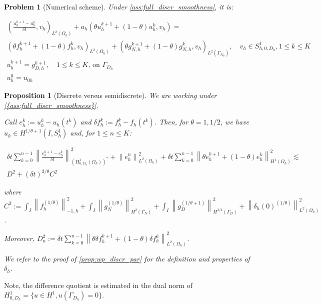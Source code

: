 \documentclass[english,a4paper,9pt,oneside]{scrbook}	%
\theoremstyle{break}
\newtheorem{prop}[equation]{Proposition}
\newtheorem{pb}[equation]{Problem}
\theoremstyle{remark}
\newcommand{\ds}{\displaystyle}
\newcommand{\norm}[1]{\left\lVert#1\right\rVert}
\begin{document}
\begin{appendices}
\begin{pb}[Numerical scheme]
\label{pb:num_scheme}
Under \cref{ass:full_discr_smoothness}, it is:

\begin{align*}
\left ( \frac{u_{h}^{k+1}-u_h^k}{\delta t}, v_h\right)_{L^2(\Omega_h)} + a_h(\theta u_h^{k+1}+(1-\theta)u^k_h, v_h) =\\ (\theta f_h^{k+1}+(1-\theta)f_h^k, v_h)_{L^2(\Omega_h)} + (\theta g_{N,h}^{k+1} + (1 - \theta)g_{N,h}^{k} , v_h)_{L^2(\Gamma_{N_h})},\quad v_h \in S^1_{h,0,D_h}, 1\leq k \leq K\\
u_h^{k+1}=g_{D,h}^{k+1},\quad 1\leq k \leq K \text{,  on } \Gamma_{D_h}\\
u_h^0=u_{0h}
\end{align*}

\end{pb}

\begin{prop}[Discrete versus semidiscrete]
\label{prop:d_vd_sd}
We are working under \cref{{ass:full_discr_smoothness}}.

Call $e_h^k:=u_h^k-u_h(t^k)$ and $\delta f_h^k:=f_h^k-f_h(t^k)$. Then, for $\theta=1, 1/2$, we have $u_h \in H^{1/\theta+1}(I, S^1_h)$ and, for $1\leq n \leq K$:

\begin{align*}
\delta t \sum_{k=0}^{n-1} \norm{ \frac{e_{h}^{k+1}-e_h^k}{\delta t}}_{(H^1_{0,D_h}(\Omega_h))^*}^2 + \norm{e_{h}^{n}}_{L^2(\Omega_h)}^2 + \delta t \sum_{k=0}^{n-1}\norm{\theta e_h^{k+1}+(1-\theta)e^k_h}_{H^1(\Omega_h)}^2 \lesssim \\
D^2 + (\delta t)^{2/\theta} C^2
\end{align*}

where $C^2:=\ds \int_I \norm{f^{(1/\theta)}_h}_{-1,h}^2+\int_I\norm{ g_{N}^{(1/\theta)}}_{H^{2}(\Gamma_{N})}^2 + \int_I\norm{g_D^{(1/\theta+1)}}_{H^{3/2}(\Gamma_D)}^2 + \norm{\delta_{h}(0)^{(1/\theta)}}_{L^2(\Omega_h)}^2$.

Moreover, $\ds D_n^2:= \ds {\delta t\sum_{k=0}^{n-1} \norm{\theta \delta f_h^{k+1}+(1-\theta)\delta f_h^k}_{L^2(\Omega_h)}^2}$.

We refer to the proof of \cref{prop:wp_discr_par} for the definition and properties of $\delta_h$.

\end{prop}

Note, the difference quotient is estimated in the dual norm of $H^1_{0,D_h}=\{u \in H^1, u(\Gamma_{D_h})=0\}$.


\end{appendices}
\end{document}
